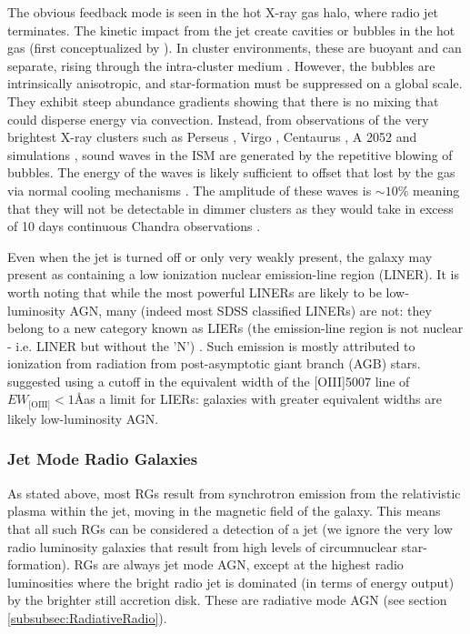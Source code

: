 			The obvious feedback mode is seen in the hot X-ray gas halo, where radio jet terminates. The kinetic impact from the jet create cavities or bubbles in the hot gas (first conceptualized by \cite{Gull1973}). In cluster environments, these are buoyant and can separate, rising through the intra-cluster medium \citep{Churazov2000, Churazov2001, McNamara2000}. However, the bubbles are intrinsically anisotropic, and star-formation must be suppressed on a global scale. They exhibit steep abundance gradients showing that there is no mixing that could disperse energy via convection. Instead, from observations of the very brightest X-ray clusters such as Perseus \citep{Fabian2003, Fabian2006}, Virgo \citep{Forman2007}, Centaurus \citep{Sanders2008}, A 2052 \citep{Blanton2011} and simulations \citep{Ruszkowski2004, Sijacki2006}, sound waves in the ISM are generated by the repetitive blowing of bubbles. The energy of the waves is likely sufficient to offset that lost by the gas via normal cooling mechanisms \citep{Fabian2003}. The amplitude of these waves is $\sim 10 \%$ meaning that they will not be detectable in dimmer clusters as they would take in excess of 10 days continuous Chandra observations \citep{Graham2008}.

			Even when the jet is turned off or only very weakly present, the galaxy may present as containing a low ionization nuclear emission-line region (LINER). It is worth noting that while the most powerful LINERs are likely to be low-luminosity AGN, many (indeed most SDSS classified LINERs) are not: they belong to a new category known as LIERs (the emission-line region is not nuclear - i.e. LINER but without the 'N') \citep{Sarzi2005, Sarzi2010, Singh2013, Belfiore2016a}. Such emission is mostly attributed to ionization from radiation from post-asymptotic giant branch (AGB) stars. \citet{Capetti2011} suggested using a cutoff in the equivalent width of the [OIII]5007 line of $EW_\text{[OIII]} < 1$\AA as a limit for LIERs: galaxies with greater equivalent widths are likely low-luminosity AGN.

		\subsubsection{Jet Mode Radio Galaxies}
			\label{subsubsec:JetRadio}
			As stated above, most RGs result from synchrotron emission from the relativistic plasma within the jet, moving in the magnetic field of the galaxy. This means that all such RGs can be considered a detection of a jet (we ignore the very low radio luminosity galaxies that result from high levels of circumnuclear star-formation). RGs are always jet mode AGN, except at the highest radio luminosities where the bright radio jet is dominated (in terms of energy output) by the brighter still accretion disk. These are radiative mode AGN (see section \ref{subsubsec:RadiativeRadio}).

